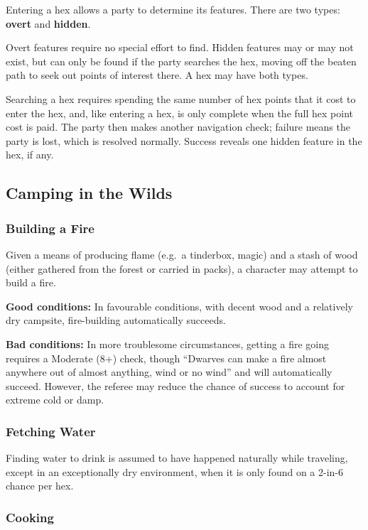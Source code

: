 \documentclass{article}
\begin{document}
\begin{multicols}{2}
Entering a hex allows a party to determine its features. There are two
types: \textbf{overt} and \textbf{hidden}.

Overt features require no special effort to find. Hidden features may or
may not exist, but can only be found if the party searches the hex,
moving off the beaten path to seek out points of interest there. A hex
may have both types.

Searching a hex requires spending the same number of hex points that it
cost to enter the hex, and, like entering a hex, is only complete when
the full hex point cost is paid. The party then makes another navigation
check; failure means the party is lost, which is resolved normally.
Success reveals one hidden feature in the hex, if any.

\subsection{Camping in the Wilds}\label{camping-in-the-wilds}

\subsubsection{Building a Fire}\label{building-a-fire}

Given a means of producing flame (e.g.~a tinderbox, magic) and a stash
of wood (either gathered from the forest or carried in packs), a
character may attempt to build a fire.

\textbf{Good conditions:} In favourable conditions, with decent wood and
a relatively dry campsite, fire-building automatically succeeds.

\textbf{Bad conditions:} In more troublesome circumstances, getting a
fire going requires a Moderate (8+) check, though ``Dwarves can make a
fire almost anywhere out of almost anything, wind or no wind'' and will
automatically succeed. However, the referee may reduce the chance of
success to account for extreme cold or damp.

\subsubsection{Fetching Water}\label{fetching-water}

Finding water to drink is assumed to have happened naturally while
traveling, except in an exceptionally dry environment, when it is only
found on a 2-in-6 chance per hex.

\subsubsection{Cooking}\label{cooking}


\end{multicols}
\end{document}
